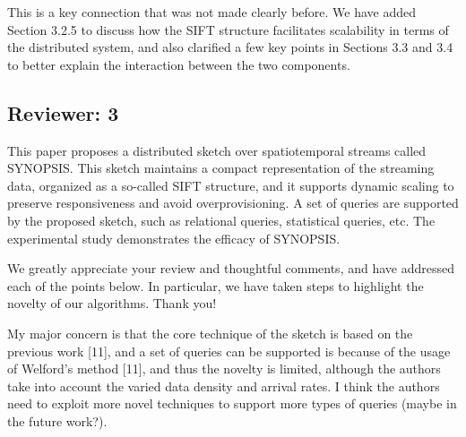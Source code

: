 \documentclass{article}
\begin{document}
\begin{tcolorbox}
    This is a key connection that was not made clearly before. We have added Section 3.2.5 to discuss how the SIFT structure facilitates scalability in terms of the distributed system, and also clarified a few key points in Sections 3.3 and 3.4 to better explain the interaction between the two components. 
\end{tcolorbox}

\subsection*{Reviewer: 3}\label{reviewer-3}

This paper proposes a distributed sketch over spatiotemporal streams
called SYNOPSIS. This sketch maintains a compact representation of the
streaming data, organized as a so-called SIFT structure, and it supports
dynamic scaling to preserve responsiveness and avoid overprovisioning. A
set of queries are supported by the proposed sketch, such as relational
queries, statistical queries, etc. The experimental study demonstrates
the efficacy of SYNOPSIS.

\begin{tcolorbox}
    We greatly appreciate your review and thoughtful comments, and have addressed each of the points below. In particular, we have taken steps to highlight the novelty of our algorithms. Thank you!
\end{tcolorbox}

My major concern is that the core technique of the sketch is based on
the previous work {[}11{]}, and a set of queries can be supported is
because of the usage of Welford's method {[}11{]}, and thus the novelty
is limited, although the authors take into account the varied data
density and arrival rates. I think the authors need to exploit more
novel techniques to support more types of queries (maybe in the future
work?).
\end{document}
